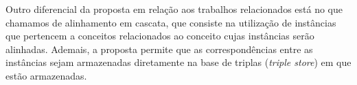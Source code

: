 Outro diferencial da proposta em relação aos trabalhos relacionados está no que chamamos de alinhamento em cascata, que consiste na utilização de instâncias que pertencem a conceitos relacionados ao conceito cujas instâncias serão alinhadas. Ademais, a proposta permite que as correspondências entre as instâncias sejam armazenadas diretamente na base de triplas (\textit{triple store}) em que estão armazenadas.
